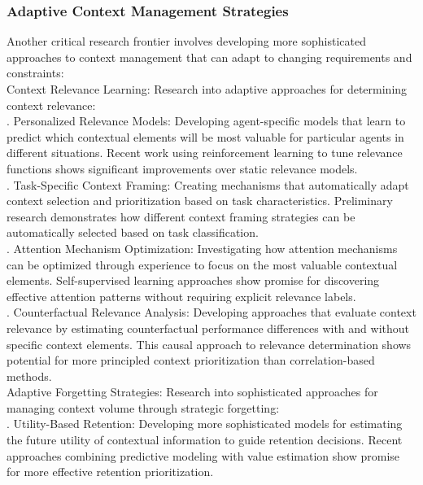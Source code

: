 \subsubsection{Adaptive Context Management Strategies}
Another critical research frontier involves developing more sophisticated approaches to context management that can adapt to changing requirements and constraints:\\ \newline
Context Relevance Learning: Research into adaptive approaches for determining context relevance:\\ . Personalized Relevance Models: Developing agent-specific models that learn to predict which contextual elements will be most valuable for particular agents in different situations. Recent work using reinforcement learning to tune relevance functions shows significant improvements over static relevance models.\\ . Task-Specific Context Framing: Creating mechanisms that automatically adapt context selection and prioritization based on task characteristics. Preliminary research demonstrates how different context framing strategies can be automatically selected based on task classification.\\ . Attention Mechanism Optimization: Investigating how attention mechanisms can be optimized through experience to focus on the most valuable contextual elements. Self-supervised learning approaches show promise for discovering effective attention patterns without requiring explicit relevance labels.\\ . Counterfactual Relevance Analysis: Developing approaches that evaluate context relevance by estimating counterfactual performance differences with and without specific context elements. This causal approach to relevance determination shows potential for more principled context prioritization than correlation-based methods.\\ \newline
Adaptive Forgetting Strategies: Research into sophisticated approaches for managing context volume through strategic forgetting:\\ . Utility-Based Retention: Developing more sophisticated models for estimating the future utility of contextual information to guide retention decisions. Recent approaches combining predictive modeling with value estimation show promise for more effective retention prioritization.\\ \newline
